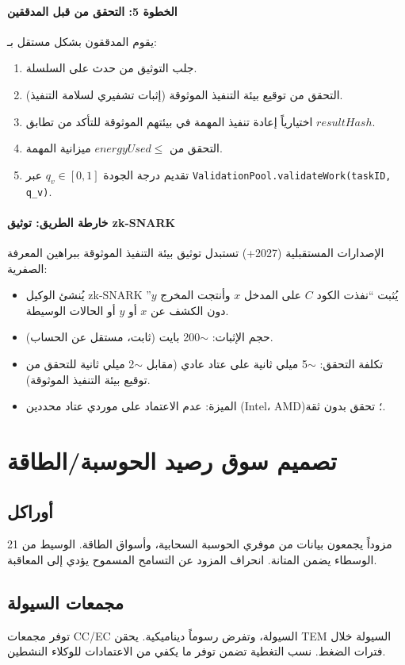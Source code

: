 \documentclass[11pt]{article}
\begin{document}
\paragraph{الخطوة 5: التحقق من قبل المدققين}
يقوم المدققون بشكل مستقل بـ:
\begin{enumerate}[noitemsep]
  \item جلب التوثيق من حدث على السلسلة.
  \item التحقق من توقيع بيئة التنفيذ الموثوقة (إثبات تشفيري لسلامة التنفيذ).
  \item اختيارياً إعادة تنفيذ المهمة في بيئتهم الموثوقة للتأكد من تطابق $resultHash$.
  \item التحقق من $energyUsed \leq$ ميزانية المهمة.
  \item تقديم درجة الجودة $q_v \in [0,1]$ عبر \texttt{ValidationPool.validateWork(taskID, q\_v)}.
\end{enumerate}

\paragraph{خارطة الطريق: توثيق zk-SNARK}
الإصدارات المستقبلية (2027+) تستبدل توثيق بيئة التنفيذ الموثوقة ببراهين المعرفة الصفرية:
\begin{itemize}[noitemsep]
  \item يُنشئ الوكيل zk-SNARK يُثبت ``نفذت الكود $C$ على المدخل $x$ وأنتجت المخرج $y$'' دون الكشف عن $x$ أو $y$ أو الحالات الوسيطة.
  \item حجم الإثبات: $\sim$200 بايت (ثابت، مستقل عن الحساب).
  \item تكلفة التحقق: $\sim$5 ميلي ثانية على عتاد عادي (مقابل $\sim$2 ميلي ثانية للتحقق من توقيع بيئة التنفيذ الموثوقة).
  \item الميزة: عدم الاعتماد على موردي عتاد محددين (Intel، AMD)؛ تحقق بدون ثقة.
\end{itemize}

\section{تصميم سوق رصيد الحوسبة/الطاقة}
\subsection{أوراكل}
21 مزوداً يجمعون بيانات من موفري الحوسبة السحابية، وأسواق الطاقة. الوسيط من الوسطاء يضمن المتانة. انحراف المزود عن التسامح المسموح يؤدي إلى المعاقبة.

\subsection{مجمعات السيولة}
توفر مجمعات CC/EC السيولة، وتفرض رسوماً ديناميكية. يحقن TEM السيولة خلال فترات الضغط. نسب التغطية تضمن توفر ما يكفي من الاعتمادات للوكلاء النشطين.
\end{document}
